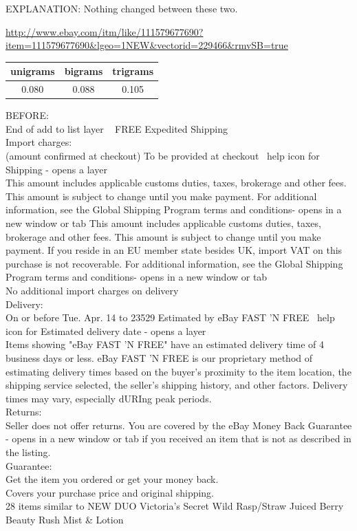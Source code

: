 \documentclass[12pt]{article}
\begin{document}
EXPLANATION: Nothing changed between these two.

\url{http://www.ebay.com/itm/like/111579677690?item=111579677690&lgeo=1NEW&vectorid=229466&rmvSB=true}\\
\begin{tabular}{|c|c|c|}
    \hline
    unigrams & bigrams & trigrams\\
    \hline
    0.080 & 0.088 & 0.105\\
    \hline
\end{tabular}

BEFORE:\\
End of add to list layer
 
FREE Expedited Shipping\\
Import charges:\\
(amount confirmed at checkout) To be provided at checkout  help icon for Shipping - opens a layer\\
This amount includes applicable customs duties, taxes, brokerage and other fees. This amount is subject to change until you make payment. For additional information, see the Global Shipping Program terms and conditions- opens in a new window or tab This amount includes applicable customs duties, taxes, brokerage and other fees. This amount is subject to change until you make payment. If you reside in an EU member state besides UK, import VAT on this purchase is not recoverable. For additional information, see the Global Shipping Program terms and conditions- opens in a new window or tab\\
No additional import charges on delivery\\
Delivery:\\
On or before Tue. Apr. 14 to 23529 Estimated by eBay FAST 'N FREE  help icon for Estimated delivery date - opens a layer\\
Items showing "eBay FAST 'N FREE" have an estimated delivery time of 4 business days or less. eBay FAST 'N FREE is our proprietary method of estimating delivery times based on the buyer's proximity to the item location, the shipping service selected, the seller's shipping history, and other factors. Delivery times may vary, especially dURIng peak periods.\\
Returns:\\
Seller does not offer returns. You are covered by the eBay Money Back Guarantee - opens in a new window or tab if you received an item that is not as described in the listing.\\
Guarantee:\\
Get the item you ordered or get your money back.\\
Covers your purchase price and original shipping.\\
28 items similar to NEW DUO Victoria's Secret Wild Rasp/Straw Juiced Berry Beauty Rush Mist \& Lotion\\
\end{document}
